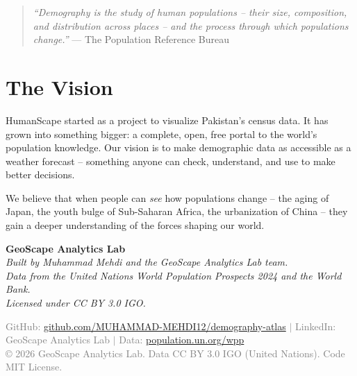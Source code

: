 \documentclass[12pt,a4paper]{article}
\begin{document}
\begin{quote}
\textit{``Demography is the study of human populations -- their size, composition,
and distribution across places -- and the process through which populations change.''}
--- The Population Reference Bureau
\end{quote}

\section{The Vision}

HumanScape started as a project to visualize Pakistan's census data. It has grown
into something bigger: a complete, open, free portal to the world's population
knowledge. Our vision is to make demographic data as accessible as a weather
forecast -- something anyone can check, understand, and use to make better decisions.

We believe that when people can \textit{see} how populations change -- the aging of
Japan, the youth bulge of Sub-Saharan Africa, the urbanization of China -- they gain
a deeper understanding of the forces shaping our world.

\vspace{0.5cm}
\begin{center}
\end{center}

\vspace{1cm}

\begin{center}
\textbf{GeoScape Analytics Lab}\\[0.2cm]
\textit{Built by Muhammad Mehdi and the GeoScape Analytics Lab team.}\\
\textit{Data from the United Nations World Population Prospects 2024 and the World Bank.}\\
\textit{Licensed under CC BY 3.0 IGO.}
\end{center}

\vspace{1cm}
\begin{center}
\textcolor{gray}{\small
GitHub: \url{github.com/MUHAMMAD-MEHDI12/demography-atlas} $\vert$
LinkedIn: GeoScape Analytics Lab $\vert$
Data: \url{population.un.org/wpp}\\[0.3cm]
\copyright{} 2026 GeoScape Analytics Lab. Data CC BY 3.0 IGO (United Nations). Code MIT License.
}
\end{center}
\end{document}
